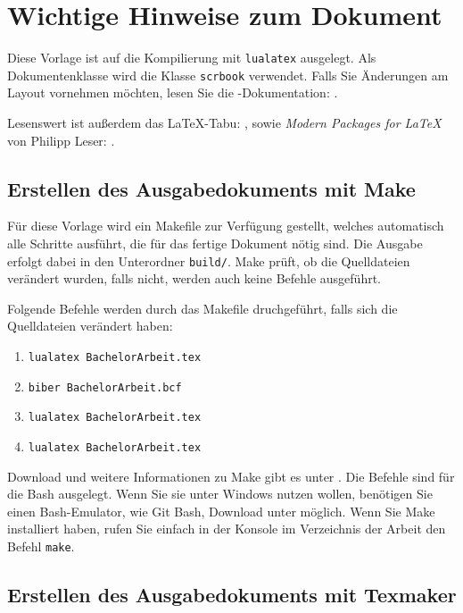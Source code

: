 \chapter{Wichtige Hinweise zum Dokument}\label{make}

Diese Vorlage ist auf die Kompilierung mit \texttt{lualatex} ausgelegt. 
Als Dokumentenklasse  wird die \KOMAScript\-Klasse \texttt{scrbook} verwendet.
Falls Sie Änderungen am Layout vornehmen möchten, lesen Sie die \KOMAScript-Dokumentation: \cite{koma}.

Lesenswert ist außerdem das \LaTeX-Tabu: \cite{l2tabu}, sowie \emph{Modern Packages for \LaTeX} von Philipp Leser: \cite{pleser}.

\section{Erstellen des Ausgabedokuments mit Make}

Für diese Vorlage wird ein Makefile zur Verfügung gestellt, welches automatisch alle Schritte ausführt, die für das fertige Dokument nötig sind.
Die Ausgabe erfolgt dabei in den Unterordner \texttt{build/}.
Make prüft, ob die Quelldateien verändert wurden, falls nicht, werden auch keine Befehle ausgeführt.

Folgende Befehle werden durch das Makefile druchgeführt, falls sich die Quelldateien verändert haben:
\begin{enumerate}
    \item \texttt{lualatex BachelorArbeit.tex}
    \item \texttt{biber BachelorArbeit.bcf}
    \item \texttt{lualatex BachelorArbeit.tex}
    \item \texttt{lualatex BachelorArbeit.tex}
\end{enumerate}


Download und weitere Informationen zu Make gibt es unter \cite{make}. Die Befehle sind für die Bash ausgelegt.
Wenn Sie sie unter Windows nutzen wollen, benötigen Sie einen Bash-Emulator, wie Git Bash, Download unter \cite{gitbash} möglich.
Wenn Sie Make installiert haben, rufen Sie einfach in der Konsole im Verzeichnis der Arbeit den Befehl \texttt{make}.

\section{Erstellen des Ausgabedokuments mit Texmaker}
